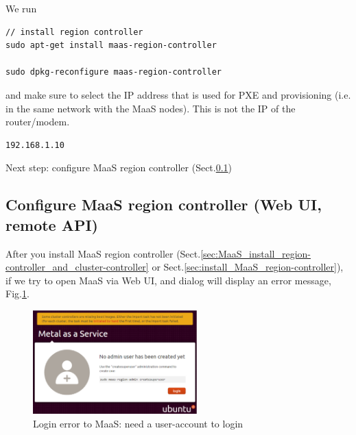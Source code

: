 
We run
\begin{verbatim}
// install region controller
sudo apt-get install maas-region-controller

sudo dpkg-reconfigure maas-region-controller
\end{verbatim}
and make sure to select the IP address that is used for PXE and provisioning
(i.e. in the same network with the MaaS nodes). This is not the IP of the
router/modem.
\begin{verbatim}
192.168.1.10
\end{verbatim}

Next step: configure MaaS region controller
(Sect.\ref{sec:configure_MaaS_region-controller})







\subsection{Configure MaaS region controller (Web UI, remote API)}
\label{sec:configure_MaaS_region-controller}

After you install MaaS region controller
(Sect.\ref{sec:MaaS_install_region-controller_and_cluster-controller} or
Sect.\ref{sec:install_MaaS_region-controller}), if we try to open MaaS via Web
UI, and dialog will display an error message, Fig.\ref{fig:MaaS_no_admin}.

\begin{figure}[hbt]
  \centerline{\includegraphics[height=4cm,
    angle=0]{./images/MaaS_no_admin.eps}}
\caption{Login error to MaaS: need a user-account to login}
\label{fig:MaaS_no_admin}
\end{figure}

